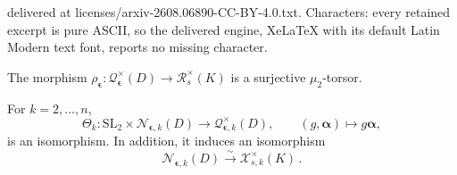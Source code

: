 \documentclass[10pt,a4paper]{amsart}
\newcommand{\SL}{\mathrm{SL}}
\newcommand{\calN}{\mathcal{N}}
\newcommand{\calQ}{\mathcal{Q}}
\newcommand{\calR}{\mathcal{R}}
\newcommand{\calX}{\mathcal{X}}
\begin{document}
delivered at licenses/arxiv-2608.06890-CC-BY-4.0.txt. Characters: every retained excerpt is pure ASCII, so the delivered engine, XeLaTeX with its default Latin Modern text font, reports no missing character.
	\begin{theorem} \label{prop.mu2torsor}
		The morphism $	\rho_{\boldsymbol{\epsilon}}:\calQ_{\boldsymbol{\epsilon}}^\times(D) \rightarrow
		\calR_s^\times(K)$ is a surjective $\mu_2$-torsor.
	\end{theorem}

	\begin{theorem} \label{thm:normalizedchart}
		For $k=2,\ldots,n$, 
		$$
		\Theta_k: \SL_2 \times\calN_{\boldsymbol{\epsilon},k}(D)\longrightarrow \calQ^\times_{{\boldsymbol{\epsilon}},k}(D),\qquad
		(g,\boldsymbol{\alpha})\longmapsto g\boldsymbol{\alpha},
		$$
		is an isomorphism.  %
		In addition, it induces an isomorphism
		$$
		\calN_{\boldsymbol{\epsilon},k}(D) \overset{\sim}{\longrightarrow} \calX_{s,k}^\times(K)\,.
		$$
	\end{theorem}
\end{document}
